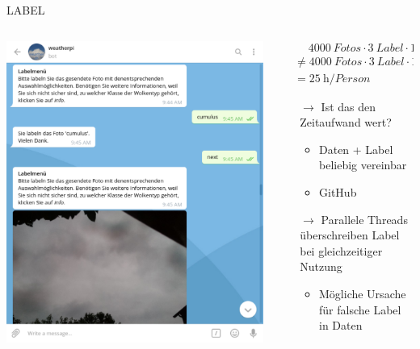 \begin{frame}[t]{LABEL}
  \begin{columns}
    \begin{column}{0.4\textwidth}
      \centering
      \includegraphics[width=\textwidth]{content/telegram_bot.pdf}
    \end{column}
    \begin{column}{0.6\textwidth}
      \begin{align*}
        &\hspace{15pt} \SI{4000}{Fotos} \cdot \SI{3}{Label} \cdot \SI{1}{\second} \\
        &\neq \SI{4000}{Fotos}
        \cdot \SI{3}{Label} \cdot \SI{15}{\second} \\
        &= \SI{25}{\hour\per Person}
      \end{align*}
      \begin{itemize}
        \item[$\rightarrow$] Ist das den Zeitaufwand wert?
          \begin{itemize}
            \item Daten + Label beliebig vereinbar
            \item GitHub
          \end{itemize}
        \item[$\rightarrow$] Parallele Threads überschreiben Label bei gleichzeitiger
          Nutzung
          \begin{itemize}
				  \item \alert{Mögliche Ursache für falsche Label in Daten}
          \end{itemize}
      \end{itemize}
    \end{column}
  \end{columns}
\end{frame}
